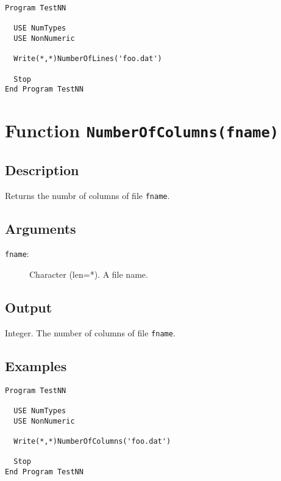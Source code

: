 \begin{lstlisting}[emph=NumberOfLines,
                   emphstyle=\color{blue},
                   frame=trBL,
                   caption=Obtainning the number of columns of a file.,
                   label=nol]
Program TestNN

  USE NumTypes
  USE NonNumeric

  Write(*,*)NumberOfLines('foo.dat')

  Stop
End Program TestNN
\end{lstlisting}


\section{Function \texttt{NumberOfColumns(fname)}}

\subsection{Description}

Returns the numbr of columns of file \texttt{fname}.

\subsection{Arguments}

\begin{description}
\item[\texttt{fname}: ] Character (len=*). A file name.
\end{description}

\subsection{Output}

Integer. The number of columns of file \texttt{fname}.

\subsection{Examples}

\begin{lstlisting}[emph=NumberOfColumns,
                   emphstyle=\color{blue},
                   frame=trBL,
                   caption=Obtainning the number of columns of a file.,
                   label=nol]
Program TestNN

  USE NumTypes
  USE NonNumeric

  Write(*,*)NumberOfColumns('foo.dat')

  Stop
End Program TestNN
\end{lstlisting}

